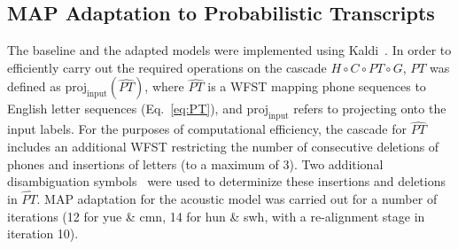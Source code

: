 \subsection{MAP Adaptation to Probabilistic Transcripts}
\label{sec:ptadapt}

The baseline and the adapted models were implemented using
Kaldi~\cite{Kaldi2011}. In order to efficiently carry out the required
operations on the cascade $H\circ C\circ PT\circ G$, $PT$ was defined
as $\mathrm{proj}_{\mathrm{input}} (\widehat{PT})$, where
$\widehat{PT}$ is a WFST mapping phone sequences to English letter
sequences (Eq.~\ref{eq:PT}), and $\mathrm{proj}_{\mathrm{input}}$
refers to projecting onto the input labels. For the purposes of
computational efficiency, the cascade for $\widehat{PT}$ includes an
additional WFST restricting the number of consecutive deletions of
phones and insertions of letters (to a maximum of 3). Two additional
disambiguation symbols~\cite{mohri2008speech} were used to determinize
these insertions and deletions in $\widehat{PT}$. MAP adaptation for
the acoustic model was carried out for a number of iterations (12 for
yue \& cmn, 14 for hun \& swh, with a re-alignment stage in iteration
10).
